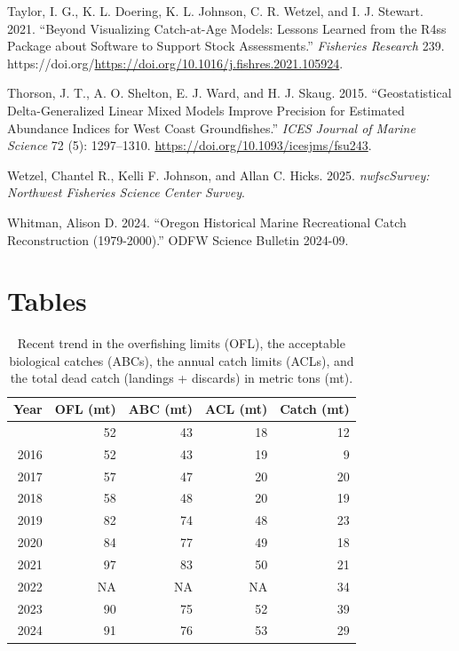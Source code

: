 \documentclass[
]{scrartcl}
\newlength{\cslhangindent}
\newenvironment{CSLReferences}[2] %
 {\begin{list}{}{%
  \setlength{\itemindent}{0pt}
  \setlength{\leftmargin}{0pt}
  \setlength{\parsep}{0pt}
  \ifodd #1
   \setlength{\leftmargin}{\cslhangindent}
   \setlength{\itemindent}{-1\cslhangindent}
  \fi
  \setlength{\itemsep}{#2\baselineskip}}}
 {\end{list}}
\begin{document}
\begin{CSLReferences}{1}{0}
Taylor, I. G., K. L. Doering, K. L. Johnson, C. R. Wetzel, and I. J.
Stewart. 2021. {``Beyond Visualizing Catch-at-Age Models: Lessons
Learned from the R4ss Package about Software to Support Stock
Assessments.''} \emph{Fisheries Research} 239.
https://doi.org/\url{https://doi.org/10.1016/j.fishres.2021.105924}.

Thorson, J. T., A. O. Shelton, E. J. Ward, and H. J. Skaug. 2015.
{``Geostatistical Delta-Generalized Linear Mixed Models Improve
Precision for Estimated Abundance Indices for {West} {Coast}
Groundfishes.''} \emph{ICES Journal of Marine Science} 72 (5):
1297--1310. \url{https://doi.org/10.1093/icesjms/fsu243}.

Wetzel, Chantel R., Kelli F. Johnson, and Allan C. Hicks. 2025.
\emph{nwfscSurvey: Northwest Fisheries Science Center Survey}.

Whitman, Alison D. 2024. {``Oregon Historical Marine Recreational Catch
Reconstruction (1979-2000).''} ODFW Science Bulletin 2024-09.

\end{CSLReferences}

\newpage{}

\section{Tables}\label{tables}

\begingroup
\fontsize{9.0pt}{10.8pt}\selectfont

\begin{longtable}{rrrrr}

\caption{\label{tbl-ye-management}Recent trend in the overfishing limits
(OFL), the acceptable biological catches (ABCs), the annual catch limits
(ACLs), and the total dead catch (landings + discards) in metric tons
(mt).}

\tabularnewline

\toprule
Year & OFL (mt) & ABC (mt) & ACL (mt) & Catch (mt) \\ 
\midrule\addlinespace[2.5pt]
2015 & 52 & 43 & 18 & 12 \\ 
2016 & 52 & 43 & 19 & 9 \\ 
2017 & 57 & 47 & 20 & 20 \\ 
2018 & 58 & 48 & 20 & 19 \\ 
2019 & 82 & 74 & 48 & 23 \\ 
2020 & 84 & 77 & 49 & 18 \\ 
2021 & 97 & 83 & 50 & 21 \\ 
2022 & NA & NA & NA & 34 \\ 
2023 & 90 & 75 & 52 & 39 \\ 
2024 & 91 & 76 & 53 & 29 \\ 
\bottomrule

\end{longtable}
\end{document}
